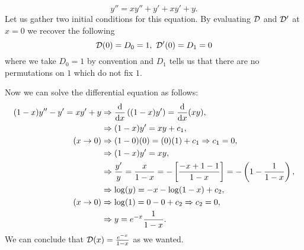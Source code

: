 \documentclass[12pt]{memoir}
\begin{document}
\begin{ptcbr}
      $$y''=xy''+y'+xy'+y.$$
      Let us gather two initial conditions for this equation. By evaluating $\mathcal{D}$ and $\mathcal{D}'$ at $x=0$ we recover the following
      $$\cD(0)=D_0=1,\ \cD'(0)=D_1=0$$
      where we take $D_0=1$ by convention and $D_1$ tells us that there are no permutations on ${1}$ which do not fix $1$.\par 
      Now we can solve the differential equation as follows:
      \begin{align*}
         (1-x)y''-y'=xy'+y&\Rightarrow\dv{x}\left((1-x)y'\right)=\dv{x}(xy),\\
         &\Rightarrow (1-x)y'=xy+c_1,\\
         (x\to 0)&\Rightarrow (1-0)(0)=(0)(1)+c_1\Rightarrow c_1=0,\\
         &\Rightarrow (1-x)y'=xy,\\
         &\Rightarrow \frac{y'}{y}=\frac{x}{1-x}=-\left\lbrack\frac{-x+1-1}{1-x}\right\rbrack=-\left(1-\frac{1}{1-x}\right),\\
         &\Rightarrow \log(y)=-x-\log(1-x)+c_2,\\
         (x\to 0)&\Rightarrow \log(1)=0-0+c_2\Rightarrow c_2=0,\\
         &\Rightarrow y=e^{-x}\frac{1}{1-x}.
      \end{align*}
      We can conclude that $\mathcal{D}(x)=\frac{e^{-x}}{1-x}$ as we wanted.
   \end{ptcbr}
\end{document}
